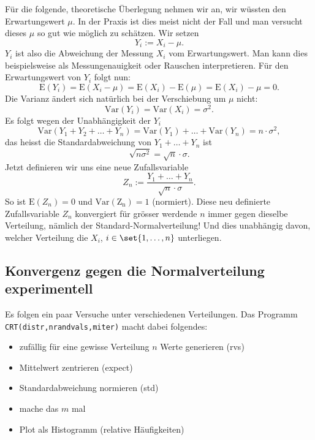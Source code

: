 \documentclass[%
11pt,%
twoside,%
titlepage,%
german,%
headsepline%
]{scrartcl}
\newcounter{theo}[section]\setcounter{theo}{0}
\begin{document}
Für die folgende, theoretische Überlegung nehmen wir an, wir wüssten den Erwartungswert $\mu$. In der Praxis ist dies meist nicht der Fall und man versucht dieses $\mu$ so gut wie möglich zu schätzen. Wir setzen
$$Y_i:=X_i-\mu.$$
$Y_i$ ist also die Abweichung der Messung $X_i$ vom Erwartungswert. Man kann dies beispielsweise als Messungenauigkeit oder Rauschen interpretieren. Für den Erwartungswert von $Y_i$ folgt nun:
$$\mathrm{E}(Y_i)=\mathrm{E}(X_i-\mu)=\mathrm{E}(X_i)-\mathrm{E}(\mu)=\mathrm{E}(X_i)-\mu=0.$$
Die Varianz ändert sich natürlich bei der Verschiebung um $\mu$ nicht:
$$\mathrm{Var}(Y_i)=\mathrm{Var}(X_i)=\sigma^2.$$
Es folgt wegen der Unabhängigkeit der $Y_i$
$$\mathrm{Var}(Y_1+Y_2+\dots+Y_n)=\mathrm{Var}(Y_1)+\dots+\mathrm{Var}(Y_n)=n\cdot\sigma^2,$$
das heisst die Standardabweichung von $Y_1+\dots+Y_n$ ist
$$\sqrt{n\sigma^2}=\sqrt{n}\cdot\sigma.$$
Jetzt definieren wir uns eine neue Zufallsvariable
$$Z_n:=\frac{Y_1+\dots+Y_n}{\sqrt{n}\cdot\sigma}.$$
So ist $\mathrm{E}(Z_n)=0$ und $\mathrm{Var(Z_n)}=1$ (normiert). Diese neu definierte Zufallsvariable $Z_n$ konvergiert für grösser werdende $n$ immer gegen dieselbe Verteilung, nämlich der Standard-Normalverteilung! Und dies unabhängig davon, welcher Verteilung die $X_i$, $i\in\set{1,\dots,n}$ unterliegen.

\subsection{Konvergenz gegen die Normalverteilung experimentell}

Es folgen ein paar Versuche unter verschiedenen Verteilungen. Das Programm \texttt{CRT(distr,nrandvals,miter)} macht dabei folgendes:
\begin{itemize}
    \item zufällig für eine gewisse Verteilung $n$ Werte generieren (rvs)
    \item Mittelwert zentrieren (expect)
    \item Standardabweichung normieren (std)
    \item mache das $m$ mal
    \item Plot als Histogramm (relative Häufigkeiten)
\end{itemize}

\clearpage



\end{document}
